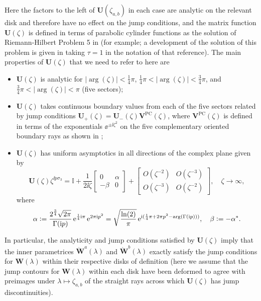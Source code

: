 Here the factors to the left of $\mathbf{U}(\zeta_{a,b})$ in each case are analytic on the relevant disk and therefore have no effect on the jump conditions, and the matrix function $\mathbf{U}(\zeta)$ is defined in terms of parabolic cylinder functions as the solution of Riemann-Hilbert Problem 5 in \cite{BilmanLM20} (for example; a development of the solution of this problem is given in \cite[Appendix A]{Miller18} taking $\tau=1$ in the notation of that reference).  The main properties of $\mathbf{U}(\zeta)$ that we need to refer to here are
\begin{itemize}
\item $\mathbf{U}(\zeta)$ is analytic for $|\arg(\zeta)|<\tfrac{1}{4}\pi$, $\tfrac{1}{4}\pi<|\arg(\zeta)|<\tfrac{3}{4}\pi$, and $\tfrac{3}{4}\pi<|\arg(\zeta)|<\pi$ (five sectors);
\item $\mathbf{U}(\zeta)$ takes continuous boundary values from each of the five sectors related by jump conditions $\mathbf{U}_+(\zeta)=\mathbf{U}_-(\zeta)\mathbf{V}^\mathrm{PC}(\zeta)$, where $\mathbf{V}^\mathrm{PC}(\zeta)$ is defined in terms of the exponentials $\ee^{\pm\ii\zeta^2}$ on the five complementary oriented boundary rays as shown in \cite[Figure 9]{BilmanLM20};
\item $\mathbf{U}(\zeta)$ has uniform asymptotics in all directions of the complex plane given by
\begin{equation}
\mathbf{U}(\zeta)\zeta^{\ii p\sigma_3}=\mathbb{I}+\frac{1}{2\ii\zeta}\begin{bmatrix}0 & \alpha\\-\beta & 0\end{bmatrix}+\begin{bmatrix}O(\zeta^{-2}) & O(\zeta^{-3})\\O(\zeta^{-3}) & O(\zeta^{-2})\end{bmatrix},\quad\zeta\to\infty,
\label{eq:PCU-asymp}
\end{equation}
where
\begin{equation}
\alpha\vcentcolon=\frac{2^\frac{3}{4}\sqrt{2\pi}}{\Gamma(\mathrm{i} p)}\,\mathrm{e}^{\frac{1}{4}\mathrm{i}\pi}\,\mathrm{e}^{2\pi\mathrm{i} p^2}
= \sqrt{\frac{\ln(2)}{\pi}}\,\mathrm{e}^{\mathrm{i}(\frac{1}{4}\pi+2\pi p^2-\arg(\Gamma(\mathrm{i} p)))},\quad\beta\vcentcolon= -\alpha^*.
\label{eq:Channels-alpha-beta}
\end{equation}
\end{itemize}
In particular, the analyticity and jump conditions satisfied by $\mathbf{U}(\zeta)$ imply that the inner parametrices $\dot{\mathbf{W}}^a(\lambda)$ and $\dot{\mathbf{W}}^b(\lambda)$ exactly satisfy the jump conditions for $\mathbf{W}(\lambda)$ within their respective disks of definition (here we assume that the jump contours for $\mathbf{W}(\lambda)$ within each disk have been deformed to agree with preimages under $\lambda\mapsto \zeta_{a,b}$ of the straight rays across which $\mathbf{U}(\zeta)$ has jump discontinuities).  

